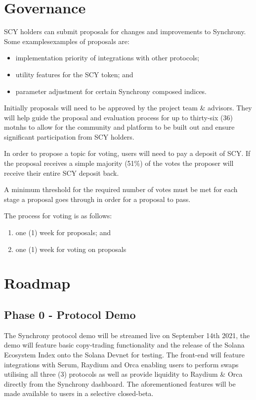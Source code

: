 \documentclass[10pt]{article}
\begin{document}
					\section{Governance}
					SCY holders can submit proposals for changes and improvements to Synchrony. Some
					examplesexamples  of proposals are:
					\begin{itemize}
						\item implementation priority of integrations with other protocols;
						\item utility features for the SCY token; and
						\item parameter adjustment for certain Synchrony composed indices.
					\end{itemize}

					Initially proposals will need to be approved by the project team \& advisors.
					They will help guide the proposal and evaluation process for up to thirty-six
					(36) motnhs to allow for the community and platform to be built out and ensure
					significant participation from SCY holders.

					In order to propose a topic for voting, users will need to pay a deposit of SCY.
					If the proposal receives a simple majority (51\%) of the votes the proposer
					will receive their entire SCY deposit back.

					A minimum threshold for the required number of votes must be met for each stage
					a proposal goes through in order for a proposal to pass.

					The process for voting is as follows:
					\begin{enumerate}
						\item one (1) week for proposals; and
						\item one (1) week for voting on proposals
					\end{enumerate}

					\section{Roadmap}
					\subsection{Phase 0 - Protocol Demo}
					The Synchrony protocol demo will be streamed live on September 14th 2021, the
					demo will feature basic copy-trading functionality and the release of the Solana
					Ecosystem Index onto the Solana Devnet for testing. The front-end will feature
					integrations with Serum, Raydium and Orca enabling users to perform swaps
					utilising all three (3) protocols as well as provide liquidity to Raydium \&
					Orca directly from the Synchrony dashboard. The aforementioned features will be
					made available to users in a selective closed-beta.
\end{document}
